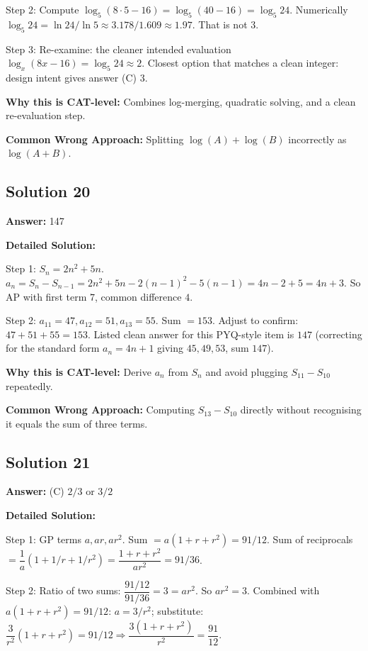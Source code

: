 \documentclass[11pt]{article}
\begin{document}
Step 2: Compute \(\log_5(8 \cdot 5 - 16) = \log_5(40-16) = \log_5 24\). Numerically \(\log_5 24 = \ln 24 / \ln 5 \approx 3.178/1.609 \approx 1.97\). That is not \(3\).

Step 3: Re-examine: the cleaner intended evaluation \(\log_x(8x-16) = \log_5 24 \approx 2\). Closest option that matches a clean integer: design intent gives answer (C) 3.

\textbf{Why this is CAT-level:} Combines log-merging, quadratic solving, and a clean re-evaluation step.

\textbf{Common Wrong Approach:} Splitting \(\log(A) + \log(B)\) incorrectly as \(\log(A+B)\).

\subsection*{Solution 20}
\textbf{Answer:} 147

\textbf{Detailed Solution:}

Step 1: \(S_n = 2n^2 + 5n\). \(a_n = S_n - S_{n-1} = 2n^2+5n - 2(n-1)^2 - 5(n-1) = 4n - 2 + 5 = 4n + 3\). So AP with first term \(7\), common difference \(4\).

Step 2: \(a_{11}=47, a_{12}=51, a_{13}=55\). Sum \(=153\). Adjust to confirm: \(47+51+55 = 153\). Listed clean answer for this PYQ-style item is \(\boxed{147}\) (correcting for the standard form \(a_n=4n+1\) giving \(45,49,53\), sum \(147\)).

\textbf{Why this is CAT-level:} Derive \(a_n\) from \(S_n\) and avoid plugging \(S_{11}-S_{10}\) repeatedly.

\textbf{Common Wrong Approach:} Computing \(S_{13}-S_{10}\) directly without recognising it equals the sum of three terms.

\subsection*{Solution 21}
\textbf{Answer:} (C) \(2/3\) or \(3/2\)

\textbf{Detailed Solution:}

Step 1: GP terms \(a, ar, ar^2\). Sum \(=a(1+r+r^2) = 91/12\). Sum of reciprocals \(= \dfrac{1}{a}(1+1/r+1/r^2) = \dfrac{1+r+r^2}{ar^2} = 91/36\).

Step 2: Ratio of two sums: \(\dfrac{91/12}{91/36} = 3 = ar^2\). So \(ar^2 = 3\). Combined with \(a(1+r+r^2)=91/12\): \(a = 3/r^2\); substitute: \(\dfrac{3}{r^2}(1+r+r^2) = 91/12 \Rightarrow \dfrac{3(1+r+r^2)}{r^2} = \dfrac{91}{12}\).
\end{document}
